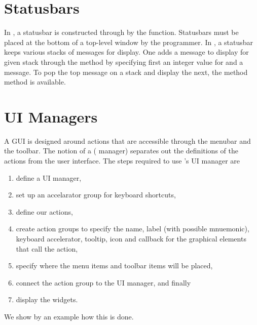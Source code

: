 \section{Statusbars}
\label{sec:RGtk2:statusbars}

In \GTK, a statusbar is constructed through by the
 function. Statusbars must be placed at the
bottom of a top-level window by the programmer. In \GTK, a statusbar
keeps various stacks of messages for display. One adds a message to
display for given stack through the  method
by specifying first an integer value for  and a
message. To pop the top message on a stack and display the next, the
method  method is available.


\section{UI Managers}
\label{sec:RGtk2:UIManager}


A GUI is designed around actions that are accessible through the
menubar and the toolbar. The notion of a 
( manager) separates out the definitions of the actions
from the user interface. The steps required to use \GTK's UI manager
are 
\begin{enumerate}
\item define a UI manager,
\item  set up an accelarator group for
keyboard shortcuts,
\item define our actions,
\item create action groups to
specify the name, label (with possible mnuemonic), keyboard
accelerator, tooltip, icon and callback for the graphical elements
that call the action,
\item specify where the menu items and toolbar
items will be placed,
\item connect the action group to the UI manager,
and finally
\item display the widgets.
\end{enumerate}

We show by an example how this is done. 

